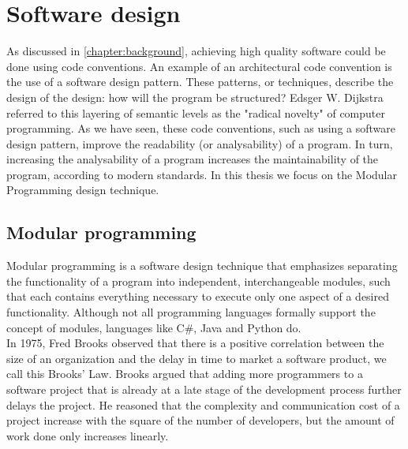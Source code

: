 \documentclass[twoside]{uva-inf-bachelor-thesis}
\begin{document}
\section{Software design}
As discussed in \autoref{chapter:background}, achieving high quality software could be done using code conventions. An example of an architectural code convention is the use of a software design pattern. These patterns, or techniques, describe the design of the design: how will the program be structured? Edsger W. Dijkstra referred to this layering of semantic levels as the "radical novelty" of computer programming\cite{dijkstra1988}. As we have seen, these code conventions, such as using a software design pattern, improve the readability (or analysability) of a program. In turn, increasing the analysability of a program increases the maintainability of the program, according to modern standards\cite{ISO9126,ISO25010}. In this thesis we focus on the Modular Programming design technique.

\subsection{Modular programming}
Modular programming is a software design technique that emphasizes separating the functionality of a program into independent, interchangeable modules, such that each contains everything necessary to execute only one aspect of a desired functionality. Although not all programming languages formally support the concept of modules, languages like C\#\cite{csharpmodules}, Java\cite{javamodules} and Python\cite{pythonmodules} do.\\

In 1975, Fred Brooks observed that there is a positive correlation between the size of an organization and the delay in time to market a software product, we call this Brooks' Law\cite{brooks1975mythical}. Brooks argued that adding more programmers to a software project that is already at a late stage of the development process further delays the project. He reasoned that the complexity and communication cost of a project increase with the square of the number of developers, but the amount of work done only increases linearly\cite{lee2000linux}.\\
\end{document}
